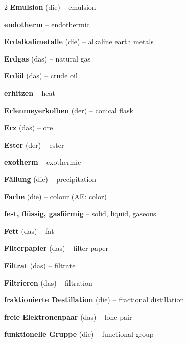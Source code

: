 \begin{multicols}{2}
\textbf{Emulsion} (die) -- emulsion\dotfill\hyperref[e:16]{\pageref*{e:16}}\par
\textbf{endotherm} -- endothermic\dotfill\hyperref[e:139]{\pageref*{e:139}}\par
\textbf{Erdalkalimetalle} (die) -- alkaline earth metals\dotfill\hyperref[e:89]{\pageref*{e:89}}\par
\textbf{Erdgas} (das) -- natural gas\dotfill\hyperref[e:232]{\pageref*{e:232}}\par
\textbf{Erdöl} (das) -- crude oil\dotfill\hyperref[e:231]{\pageref*{e:231}}\par
\textbf{erhitzen} -- heat\dotfill\hyperref[e:65]{\pageref*{e:65}}\par
\textbf{Erlenmeyerkolben} (der) -- conical flask\dotfill\hyperref[e:41]{\pageref*{e:41}}\par
\textbf{Erz} (das) -- ore\dotfill\hyperref[e:206]{\pageref*{e:206}}\par
\textbf{Ester} (der) -- ester\dotfill\hyperref[e:224]{\pageref*{e:224}}\par
\textbf{exotherm} -- exothermic\dotfill\hyperref[e:138]{\pageref*{e:138}}\par

\par\nopagebreak
\textbf{Fällung} (die) -- precipitation\dotfill\hyperref[e:136]{\pageref*{e:136}}\par
\textbf{Farbe} (die) -- colour (AE: color)\dotfill\hyperref[e:21]{\pageref*{e:21}}\par
\textbf{fest, flüssig, gasförmig} -- solid, liquid, gaseous\dotfill\hyperref[e:29]{\pageref*{e:29}}\par
\textbf{Fett} (das) -- fat\dotfill\hyperref[e:240]{\pageref*{e:240}}\par
\textbf{Filterpapier} (das) -- filter paper\dotfill\hyperref[e:45]{\pageref*{e:45}}\par
\textbf{Filtrat} (das) -- filtrate\dotfill\hyperref[e:32]{\pageref*{e:32}}\par
\textbf{Filtrieren} (das) -- filtration\dotfill\hyperref[e:31]{\pageref*{e:31}}\par
\textbf{fraktionierte Destillation} (die) -- fractional distillation\dotfill\hyperref[e:233]{\pageref*{e:233}}\par
\textbf{freie Elektronenpaar} (das) -- lone pair\dotfill\hyperref[e:111]{\pageref*{e:111}}\par
\textbf{funktionelle Gruppe} (die) -- functional group\dotfill\hyperref[e:218]{\pageref*{e:218}}\par


\end{multicols}
